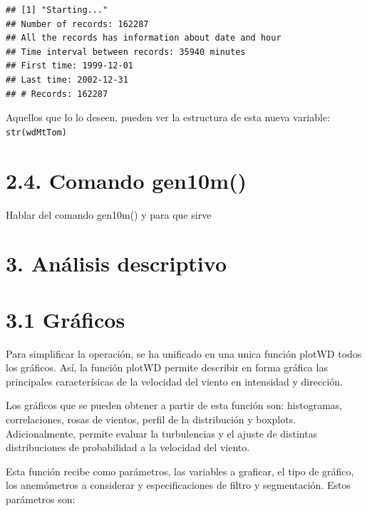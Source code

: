 \documentclass[]{article}
\begin{document}
\begin{verbatim}
## [1] "Starting..."
## Number of records: 162287
## All the records has information about date and hour
## Time interval between records: 35940 minutes 
## First time: 1999-12-01 
## Last time: 2002-12-31 
## # Records: 162287
\end{verbatim}

Aquellos que lo lo deseen, pueden ver la estructura de esta nueva
variable: \texttt{str(wdMtTom)}

\section{2.4. Comando gen10m()}\label{comando-gen10m}

Hablar del comando gen10m() y para que sirve

\section{3. Análisis descriptivo}\label{analisis-descriptivo}

\section{3.1 Gráficos}\label{graficos}

Para simplificar la operación, se ha unificado en una unica función
plotWD todos los gráficos. Así, la función plotWD permite describir en
forma gráfica las principales caracterísicas de la velocidad del viento
en intensidad y dirección.

Los gráficos que se pueden obtener a partir de esta función son:
histogramas, correlaciones, rosas de vientos, perfil de la distribución
y boxplots. Adicionalmente, permite evaluar la turbulencias y el ajuste
de distintas distribuciones de probabilidad a la velocidad del viento.

Esta función recibe como parámetros, las variables a graficar, el tipo
de gráfico, los anemómetros a considerar y especificaciones de filtro y
segmentación. Estos parámetros son:
\end{document}
